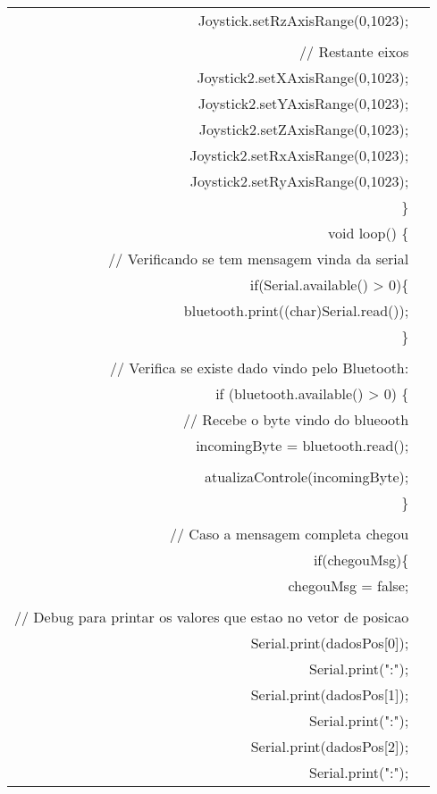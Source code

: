\begin{longtable}{Rp{15cm}}
\qquad  Joystick.setRzAxisRange(0,1023);  \\    
\\
\qquad  // Restante eixos \\
\qquad  Joystick2.setXAxisRange(0,1023); \\
\qquad  Joystick2.setYAxisRange(0,1023); \\
\qquad  Joystick2.setZAxisRange(0,1023); \\
\qquad  Joystick2.setRxAxisRange(0,1023); \\
\qquad  Joystick2.setRyAxisRange(0,1023); \\ 
\}
\\
void loop() \{ \\
\qquad  // Verificando se tem mensagem vinda da serial \\
\qquad  if(Serial.available() > 0)\{ \\
\qquad \qquad    bluetooth.print((char)Serial.read()); \\
\qquad  \} \\
 \\
\qquad  // Verifica se existe dado vindo pelo Bluetooth: \\
\qquad  if (bluetooth.available() > 0) \{ \\
\qquad \qquad    // Recebe o byte vindo do blueooth \\
\qquad \qquad    incomingByte = bluetooth.read(); \\
   \\
\qquad \qquad    atualizaControle(incomingByte); \\
\qquad  \} \\
\\
\qquad // Caso a mensagem completa chegou \\
\qquad    if(chegouMsg)\{ \\
\qquad \qquad    chegouMsg = false; \\
\\
\qquad \qquad    // Debug para printar os valores que estao no vetor de posicao \\
\qquad \qquad    Serial.print(dadosPos[0]); \\
\qquad \qquad    Serial.print(":");  \\
\qquad \qquad    Serial.print(dadosPos[1]);   \\
\qquad \qquad    Serial.print(":");  \\
\qquad \qquad    Serial.print(dadosPos[2]);    \\
\qquad \qquad    Serial.print(":");  \\

\end{longtable}
